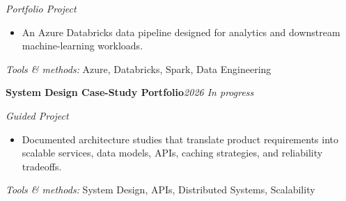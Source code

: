 \documentclass[9pt,letterpaper]{extarticle}
\newcommand{\entry}[2]{\Needspace{4\baselineskip}\textbf{#1}\hfill\textit{#2}\par}
\begin{document}
\textit{Portfolio Project}\par
\begin{itemize}
\item An Azure Databricks data pipeline designed for analytics and downstream machine-learning workloads.
\end{itemize}
{\small\textit{Tools \& methods:} Azure, Databricks, Spark, Data Engineering\par}
\entry{System Design Case-Study Portfolio}{2026 \textbar{} In progress}
\textit{Guided Project}\par
\begin{itemize}
\item Documented architecture studies that translate product requirements into scalable services, data models, APIs, caching strategies, and reliability tradeoffs.
\end{itemize}
{\small\textit{Tools \& methods:} System Design, APIs, Distributed Systems, Scalability\par}
\end{document}

